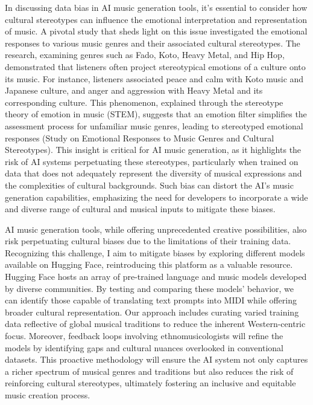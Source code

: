 \documentclass[10pt,twocolumn]{article}
\begin{document}
In discussing data bias in AI music generation tools, it's essential to consider how cultural stereotypes can influence the emotional interpretation and representation of music. A pivotal study \cite{stereotype1} that sheds light on this issue investigated the emotional responses to various music genres and their associated cultural stereotypes. The research, examining genres such as Fado, Koto, Heavy Metal, and Hip Hop, demonstrated that listeners often project stereotypical emotions of a culture onto its music. For instance, listeners associated peace and calm with Koto music and Japanese culture, and anger and aggression with Heavy Metal and its corresponding culture. This phenomenon, explained through the stereotype theory of emotion in music (STEM), suggests that an emotion filter simplifies the assessment process for unfamiliar music genres, leading to stereotyped emotional responses (Study on Emotional Responses to Music Genres and Cultural Stereotypes). This insight is critical for AI music generation, as it highlights the risk of AI systems perpetuating these stereotypes, particularly when trained on data that does not adequately represent the diversity of musical expressions and the complexities of cultural backgrounds. Such bias can distort the AI's music generation capabilities, emphasizing the need for developers to incorporate a wide and diverse range of cultural and musical inputs to mitigate these biases.

AI music generation tools, while offering unprecedented creative possibilities, also risk perpetuating cultural biases due to the limitations of their training data. Recognizing this challenge, I aim to mitigate biases by exploring different models available on Hugging Face, reintroducing this platform as a valuable resource. Hugging Face hosts an array of pre-trained language and music models developed by diverse communities. By testing and comparing these models' behavior, we can identify those capable of translating text prompts into MIDI while offering broader cultural representation. Our approach includes curating varied training data reflective of global musical traditions to reduce the inherent Western-centric focus. Moreover, feedback loops involving ethnomusicologists will refine the models by identifying gaps and cultural nuances overlooked in conventional datasets. This proactive methodology will ensure the AI system not only captures a richer spectrum of musical genres and traditions but also reduces the risk of reinforcing cultural stereotypes, ultimately fostering an inclusive and equitable music creation process.
\end{document}
